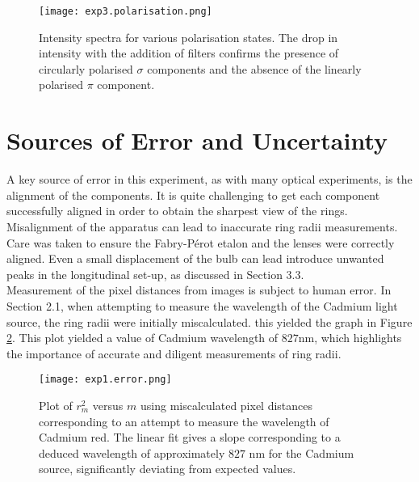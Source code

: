 \documentclass[11pt,twocolumn, a4paper]{article}
\numberwithin{equation}{section} %
\numberwithin{figure}{section} %
\numberwithin{table}{section} %
\begin{document}
\begin{figure}[H]
    \centering
    \texttt{[image: exp3.polarisation.png]}
    \caption{Intensity spectra for various polarisation states. The drop in intensity with the addition of filters confirms the presence of circularly polarised \(\sigma\) components and the absence of the linearly polarised \(\pi\) component.}
    \label{fig:exp3pol}
\end{figure}

\section{Sources of Error and Uncertainty}
A key source of error in this experiment, as with many optical experiments, is the alignment of the components. It is quite challenging to get each component successfully aligned in order to obtain the sharpest view of the rings. Misalignment of the apparatus can lead to inaccurate ring radii measurements. Care was taken to ensure the Fabry-Pérot etalon and the lenses were correctly aligned. Even a small displacement of the bulb can lead introduce unwanted peaks in the longitudinal set-up, as discussed in Section 3.3. \\ 

Measurement of the pixel distances from images is subject to human error. In Section 2.1, when attempting to measure the wavelength of the Cadmium light source, the ring radii were initially miscalculated. this yielded the graph in Figure \ref{fig:exp1error}. This plot yielded a value of Cadmium wavelength of \(827\)nm, which highlights the importance of accurate and diligent measurements of ring radii. 
\begin{figure}[H]
    \centering
    \texttt{[image: exp1.error.png]}
    \caption{Plot of \(r_m^2\) versus \(m\) using miscalculated pixel distances corresponding to an attempt to measure the wavelength of Cadmium red. The linear fit gives a slope corresponding to a deduced wavelength of approximately $827$ nm for the Cadmium source, significantly deviating from expected values. }
    \label{fig:exp1error}
\end{figure}
\end{document}
